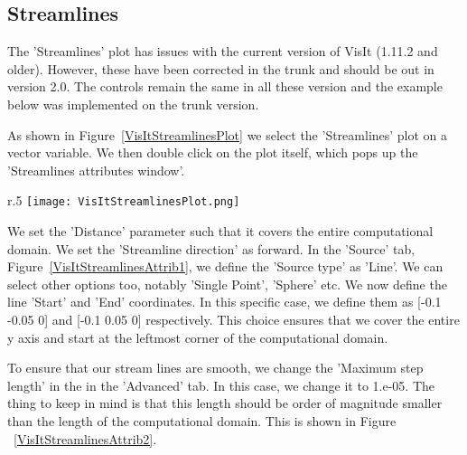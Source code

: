 \begin{figure}[h]
  \centering
 \vspace{5pt}
  \hspace{50pt}
 \vspace{-10pt}
  \caption{}
 \vspace{-10pt}
  \label{}

\end{figure}


\subsection{Streamlines}

The 'Streamlines' plot has issues with the current version of VisIt
(1.11.2 and older). However, these have been corrected in the trunk
and should be out in version 2.0. The controls remain the same in all
these version and the example below was implemented on the trunk
version.

As shown in Figure~\ref{VisItStreamlinesPlot} we select the
'Streamlines' plot on a vector variable. We then double click on the
plot itself, which pops up the 'Streamlines attributes window'.

\begin{wrapfigure}{r}{.5\textwidth}
  \center
  \vspace{-10pt}
  \texttt{[image: VisItStreamlinesPlot.png]}
  \caption{Selecting the 'Streamlines' plot on a vector variable}
  \label{VisItStreamlinesPlot}
\end{wrapfigure}

We set the 'Distance' parameter such that it covers the entire
computational domain. We set the 'Streamline direction' as forward. In
the 'Source' tab, Figure~\ref{VisItStreamlinesAttrib1}, we define the
'Source type' as 'Line'. We can select other options too, notably
'Single Point', 'Sphere' etc. We now define the line 'Start' and 'End'
coordinates. In this specific case, we define them as [-0.1 -0.05 0]
and [-0.1 0.05 0] respectively. This choice ensures that we cover the
entire y axis and start at the leftmost corner of the computational
domain.

To ensure that our stream lines are smooth, we change the 'Maximum
step length' in the in the 'Advanced' tab. In this case, we change it
to 1.e-05. The thing to keep in mind is that this length should be
order of magnitude smaller than the length of the computational
domain. This is shown in Figure ~\ref{VisItStreamlinesAttrib2}.


